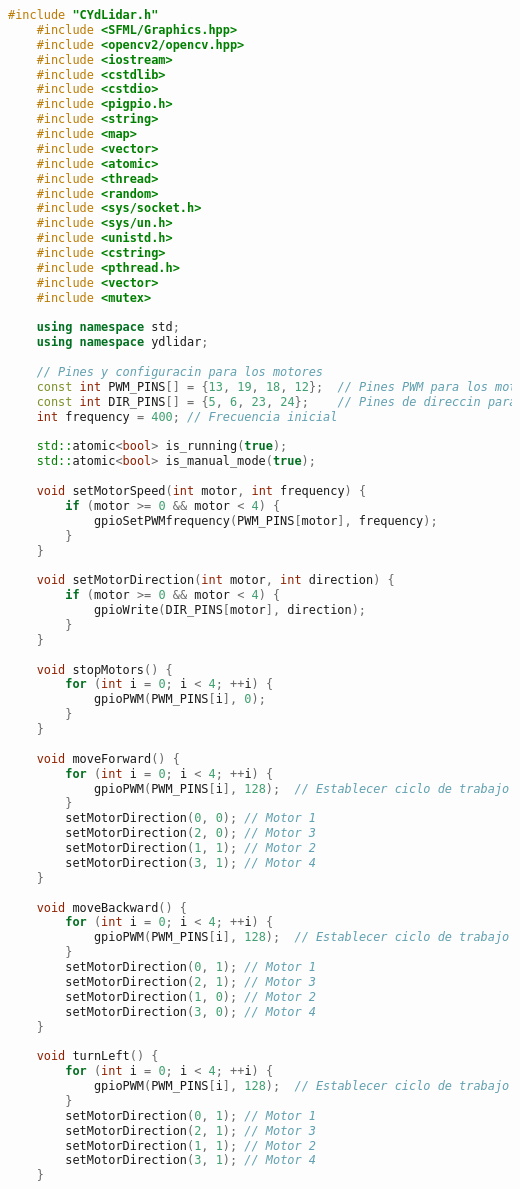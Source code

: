 \begin{lstlisting}[language={C++}, caption={Primer ajuste de c\'odigo}, label={PrimerAjuste}]
    #include "CYdLidar.h"
    #include <SFML/Graphics.hpp>
    #include <opencv2/opencv.hpp>
    #include <iostream>
    #include <cstdlib>
    #include <cstdio>
    #include <pigpio.h>
    #include <string>
    #include <map>
    #include <vector>
    #include <atomic>
    #include <thread>
    #include <random>
    #include <sys/socket.h>
    #include <sys/un.h>
    #include <unistd.h>
    #include <cstring>
    #include <pthread.h>
    #include <vector>
    #include <mutex>
    
    using namespace std;
    using namespace ydlidar;
    
    // Pines y configuracin para los motores
    const int PWM_PINS[] = {13, 19, 18, 12};  // Pines PWM para los motores
    const int DIR_PINS[] = {5, 6, 23, 24};    // Pines de direccin para los motores
    int frequency = 400; // Frecuencia inicial
    
    std::atomic<bool> is_running(true);
    std::atomic<bool> is_manual_mode(true);
    
    void setMotorSpeed(int motor, int frequency) {
        if (motor >= 0 && motor < 4) {
            gpioSetPWMfrequency(PWM_PINS[motor], frequency);
        }
    }
    
    void setMotorDirection(int motor, int direction) {
        if (motor >= 0 && motor < 4) {
            gpioWrite(DIR_PINS[motor], direction);
        }
    }
    
    void stopMotors() {
        for (int i = 0; i < 4; ++i) {
            gpioPWM(PWM_PINS[i], 0);
        }
    }
    
    void moveForward() {
        for (int i = 0; i < 4; ++i) {
            gpioPWM(PWM_PINS[i], 128);  // Establecer ciclo de trabajo al 50%
        }
        setMotorDirection(0, 0); // Motor 1
        setMotorDirection(2, 0); // Motor 3
        setMotorDirection(1, 1); // Motor 2
        setMotorDirection(3, 1); // Motor 4
    }
    
    void moveBackward() {
        for (int i = 0; i < 4; ++i) {
            gpioPWM(PWM_PINS[i], 128);  // Establecer ciclo de trabajo al 50%
        }
        setMotorDirection(0, 1); // Motor 1
        setMotorDirection(2, 1); // Motor 3
        setMotorDirection(1, 0); // Motor 2
        setMotorDirection(3, 0); // Motor 4
    }
    
    void turnLeft() {
        for (int i = 0; i < 4; ++i) {
            gpioPWM(PWM_PINS[i], 128);  // Establecer ciclo de trabajo al 50%
        }
        setMotorDirection(0, 1); // Motor 1
        setMotorDirection(2, 1); // Motor 3
        setMotorDirection(1, 1); // Motor 2
        setMotorDirection(3, 1); // Motor 4
    }
    

\end{lstlisting}
